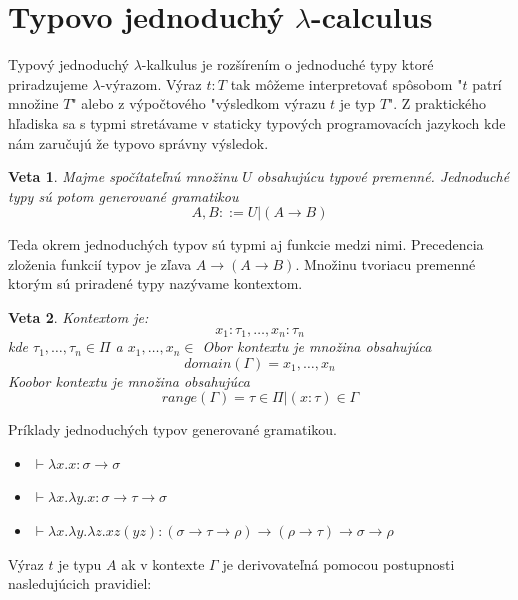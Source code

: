 \documentclass[a4paper,10pt,oneside]{report}%
\newtheorem{theorem}{Veta}[chapter]
\begin{document}
\section{Typovo jednoduchý $\lambda$-calculus}
    Typový jednoduchý $\lambda$-kalkulus je rozšírením o jednoduché typy ktoré
priradzujeme $\lambda$-výrazom.
    Výraz $t : T$ tak môžeme interpretovať spôsobom "$t$ patrí množine $T$" alebo
z výpočtového "výsledkom výrazu $t$ je typ $T$". Z praktického hľadiska sa s typmi
stretávame v staticky typových programovacích jazykoch kde nám zaručujú že typovo
správny výsledok.
\begin{theorem}
    Majme spočítateľnú množinu $U$ obsahujúcu typové premenné. Jednoduché typy
    sú potom generované gramatikou
    \begin{equation*}
        A,B ::= U | (A \to B)
    \end{equation*}
\end{theorem}
    Teda okrem jednoduchých typov sú typmi aj funkcie medzi nimi.
    Precedencia zloženia funkcií typov je zľava $A \to ( A  \to B )$. 
    Množinu tvoriacu premenné ktorým sú priradené typy nazývame kontextom.
\begin{theorem}
    Kontextom je:
    \begin{equation*}
        { x_{1} : \tau_{1}, \dots, x_{n} : \tau_{n} }
    \end{equation*}
    kde $\tau_{1}, \dots, \tau_{n} \in \Pi$ a $x_{1}, \dots , x_{n} \in$
    Obor kontextu je množina obsahujúca
    \begin{equation*}
        domain(\Gamma) = { x_{1}, \dots, x_{n} }
    \end{equation*}
    Koobor kontextu je množina obsahujúca
    \begin{equation*}
        range( \Gamma ) = { \tau \in \Pi  | (x : \tau ) \in \Gamma }
    \end{equation*}
\end{theorem}
    Príklady jednoduchých typov generované gramatikou.
\begin{itemize}
    \item $\vdash \lambda x.x : \sigma \to \sigma$
    \item $\vdash \lambda x. \lambda y.x : \sigma \to \tau \to \sigma$
    \item $\vdash \lambda x. \lambda y. \lambda z.x z (y z): (\sigma \to \tau \to \rho) \to (\rho \to \tau) \to \sigma \to \rho$
\end{itemize}

    Výraz $t$ je typu $A$ ak v kontexte $\Gamma$ je derivovateľná pomocou
postupnosti nasledujúcich pravidiel:
\end{document}

